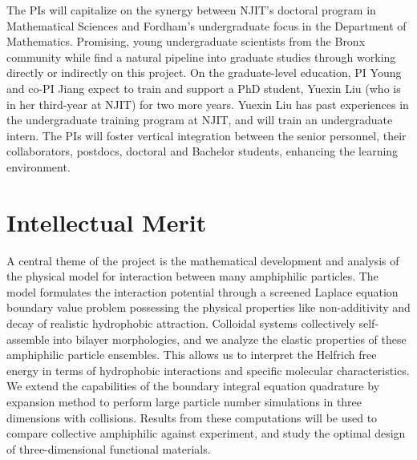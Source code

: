 The PIs will capitalize on the synergy between NJIT's doctoral program in Mathematical Sciences 
and Fordham's undergraduate focus in the Department of Mathematics. 
Promising, young undergraduate scientists from the Bronx community 
while find a natural pipeline into graduate studies through working directly 
or indirectly on this project. 
On the graduate-level education, PI Young and co-PI Jiang expect to train and support
a PhD student, Yuexin Liu (who is in her third-year at NJIT) for two more years. Yuexin Liu has past experiences
in the undergraduate training program at NJIT, and will train an undergraduate intern. 
The PIs will foster vertical integration between the senior personnel, their collaborators, postdocs, 
doctoral and Bachelor students, enhancing the
learning environment.
%


%
%

\section{Intellectual Merit}
A central theme of the project is the mathematical development and 
analysis of the physical model for interaction between many amphiphilic 
particles. The model formulates the interaction potential through a
screened Laplace equation boundary value problem possessing 
the physical properties like non-additivity and decay of realistic hydrophobic attraction.
Colloidal systems collectively self-assemble into bilayer
morphologies, and we analyze the elastic properties of these amphiphilic particle ensembles.
This allows us to interpret the Helfrich free energy in terms of hydrophobic interactions and 
specific molecular characteristics. We extend the capabilities of the
boundary integral equation quadrature by expansion method to perform
large particle number simulations in three dimensions with collisions. 
Results from these computations will be used to compare collective  amphiphilic 
against experiment,  and study the optimal design of three-dimensional functional materials. 


